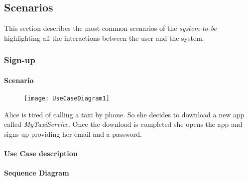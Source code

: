 
\subsection{Scenarios}
\label{sec:scenarios}
This section describes the most common scenarios of the \emph{system-to-be} highlighting all the interactions between the user and the system.

\subsubsection{Sign-up} 
\label{ssub:login_scenario}
\paragraph{Scenario} 
\begin{figure}[h]
\texttt{[image: UseCaseDiagram1]}
\centering
\end{figure}
Alice is tired of calling a taxi by phone. So she decides to download a new app called \emph{MyTaxiService}.
Once the download is completed she opens the app and signs-up providing her email and a password.

\paragraph{Use Case description} 

\paragraph{Sequence Diagram}